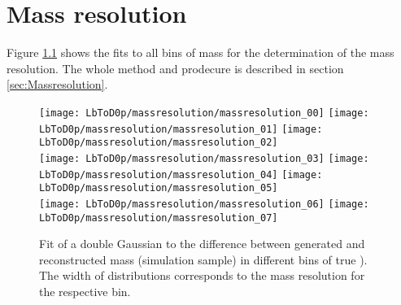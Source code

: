 \chapter{Mass resolution}
\label{app:Massresolution}
Figure \ref{fig:massresolution_all} shows the fits to all bins of \Dz\proton mass for the determination of the mass resolution.
The whole method and prodecure is described in section \ref{sec:Massresolution}.
\begin{figure}[tb]
    \centering
	\texttt{[image: LbToD0p/massresolution/massresolution\_00]}
	\texttt{[image: LbToD0p/massresolution/massresolution\_01]}
	\texttt{[image: LbToD0p/massresolution/massresolution\_02]} \\
	\texttt{[image: LbToD0p/massresolution/massresolution\_03]}
	\texttt{[image: LbToD0p/massresolution/massresolution\_04]}
	\texttt{[image: LbToD0p/massresolution/massresolution\_05]} \\
	\texttt{[image: LbToD0p/massresolution/massresolution\_06]}
	\texttt{[image: LbToD0p/massresolution/massresolution\_07]}
	\caption{Fit of a double Gaussian to the difference between generated and reconstructed \Dz\proton mass (simulation sample) in different bins of true \Dz\proton). The width of distributions corresponds to the mass resolution for the respective bin.}
    \label{fig:massresolution_all}
\end{figure}

